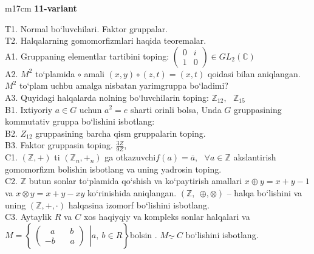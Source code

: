 \documentclass{article}
\begin{document}
\begin{tabular}{m{17cm}}
\textbf{11-variant}
\newline

T1. Normal bo`luvchilari. Faktor gruppalar. \\
T2. Halqalarning gomomorfizmlari haqida teoremalar. \\
A1. Gruppaning elementlar tartibini toping: \(\begin{pmatrix}
0 & i \\
1 & 0
\end{pmatrix} \in GL_{2}(\mathbb{C})\) \\
A2. \(M^{2}\) to`plamida \(\circ\) amali \((x,y) \circ (z,t) = (x,t)\) qoidasi bilan aniqlangan. \(M^{2}\) to`plam uchbu amalga nisbatan yarimgruppa bo`ladimi? \\
A3. Quyidagi halqalarda nolning bo`luvchilarin toping: \(\mathbb{Z}_{12},\ \ \ \mathbb{Z}_{15}\) \\
B1. Ixtiyoriy \(a \in G\) uchun \(a^{2} = e\) sharti orinli bolsa, Unda \(G\) gruppasining kommutativ gruppa bo`lishini isbotlang: \\
B2. \(Z_{12}\) gruppasining barcha qism gruppalarin toping. \\
B3. Faktor gruppasin toping. \(\frac{3Z}{9Z}\), \\
C1. \(\left( \mathbb{Z}, + \right)\) ti \(\left( \mathbb{Z}_{n}, +_{n} \right)\) ga o\textquotesingle tkazuvchi\(f(a) = \overline{a},\ \ \ \forall a\mathbb{\in Z}\) akslantirish gomomorfizm bolishin isbotlang va uning yadrosin toping. \\
C2. \(\mathbb{Z}\) butun sonlar to`plamida qo`shish va ko`paytirish amallari \(x \oplus y = x + y - 1\) va \(x \otimes y = x + y - xy\) ko`rinishida aniqlangan. \((\mathbb{Z},\ \  \oplus , \otimes )\) -- halqa bo`lishini va uning \((\mathbb{Z}, + , \cdot )\) halqasina izomorf bo`lishini isbotlang. \\
C3. Aytaylik \(R\) va \(C\) xos haqiyqiy va kompleks sonlar halqalari va\(M = \left\{ \left. \ \begin{pmatrix}
\ \ \ a\ \ \ \ \ \ \ \ b \\
 - b\ \ \ \ \ \ \ \ a
\end{pmatrix}\ \  \right|a,\ b \in R \right\}\)bo\textquotesingle lsin . \(M\underline{\sim}\ C\) bo`lishini isbotlang. \\

\end{tabular}
\vspace{1cm}
\end{document}
